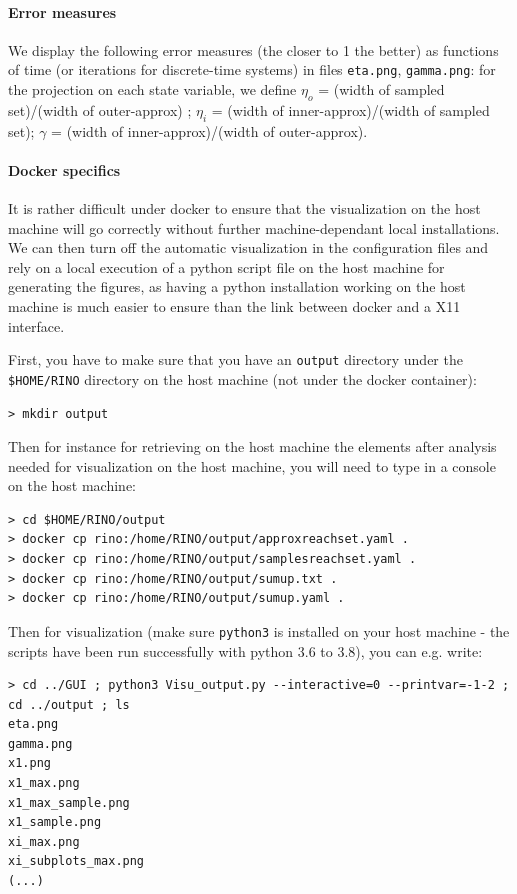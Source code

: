 \documentclass{article}
\begin{document}
\paragraph{Error measures}
We display the following error measures (the closer to 1 the better) as functions of time (or iterations for discrete-time systems) in files \texttt{eta.png},  \texttt{gamma.png}: for the projection on each state variable, we define $\eta_o$ = (width of sampled set)/(width of outer-approx) ; $\eta_i$ = (width of inner-approx)/(width of sampled set);
$\gamma$ = (width of inner-approx)/(width of outer-approx).

\paragraph{Docker specifics}

It is rather difficult under docker to ensure that the visualization on the host
machine will go correctly without further machine-dependant local installations.
We can then turn off the automatic visualization in the configuration files 
and rely on a local execution of a python script file on the
host machine for generating the figures, as having a python installation working
on the host machine is much easier to ensure than the link between docker and
a X11 interface.

First, you have to make sure that you have an \texttt{output} directory under the \texttt{\$HOME/RINO} directory on the host machine (not under the docker container): 
\begin{verbatim}
> mkdir output
\end{verbatim}

Then for instance for retrieving on the host machine the elements after analysis needed for visualization on the host machine, you will need to type in a console on the host machine:

\begin{verbatim}
> cd $HOME/RINO/output
> docker cp rino:/home/RINO/output/approxreachset.yaml . 
> docker cp rino:/home/RINO/output/samplesreachset.yaml .
> docker cp rino:/home/RINO/output/sumup.txt .
> docker cp rino:/home/RINO/output/sumup.yaml .
\end{verbatim}


Then for visualization (make sure \texttt{python3} is installed on your host machine - the scripts have been run successfully with python 3.6 to 3.8), you can e.g. write: 
\begin{verbatim}
> cd ../GUI ; python3 Visu_output.py --interactive=0 --printvar=-1-2 ; cd ../output ; ls
eta.png
gamma.png
x1.png
x1_max.png
x1_max_sample.png
x1_sample.png
xi_max.png
xi_subplots_max.png
(...)
\end{verbatim}
\end{document}
